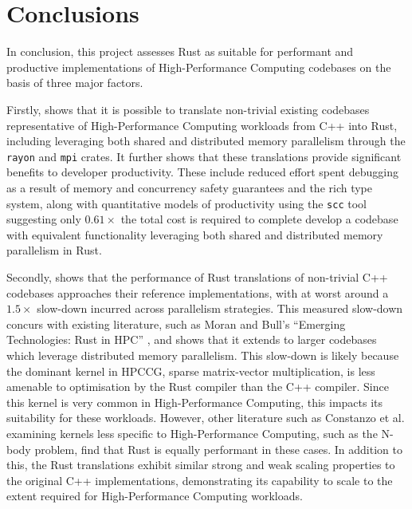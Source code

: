 \chapter{Conclusions}
\label{ch:conclusions}


In conclusion, this project assesses Rust as suitable for performant and productive implementations of High-Performance Computing codebases on the basis of three major factors.

Firstly,  shows that it is possible to translate non-trivial existing codebases representative of High-Performance Computing workloads from C++ into Rust, including leveraging both shared and distributed memory parallelism through the \texttt{rayon} and \texttt{mpi} crates. It further shows that these translations provide significant benefits to developer productivity. These include reduced effort spent debugging as a result of memory and concurrency safety guarantees and the rich type system, along with quantitative models of productivity using the \texttt{scc} tool suggesting only $0.61 \times$ the total cost is required to complete develop a codebase with equivalent functionality leveraging both shared and distributed memory parallelism in Rust.

Secondly,  shows that the performance of Rust translations of non-trivial C++ codebases approaches their reference implementations, with at worst around a $1.5 \times$ slow-down incurred across parallelism strategies. This measured slow-down concurs with existing literature, such as Moran and Bull's ``Emerging Technologies: Rust in HPC'' \cite{moranEmergingTechnologiesRust2023}, and shows that it extends to larger codebases which leverage distributed memory parallelism. This slow-down is likely because the dominant kernel in HPCCG, sparse matrix-vector multiplication, is less amenable to optimisation by the Rust compiler than the C++ compiler. Since this kernel is very common in High-Performance Computing, this impacts its suitability for these workloads. However, other literature such as Constanzo et al. \cite{costanzoPerformanceVsProgramming2021} examining kernels less specific to High-Performance Computing, such as the N-body problem, find that Rust is equally performant in these cases. In addition to this, the Rust translations exhibit similar strong and weak scaling properties to the original C++ implementations, demonstrating its capability to scale to the extent required for High-Performance Computing workloads.

